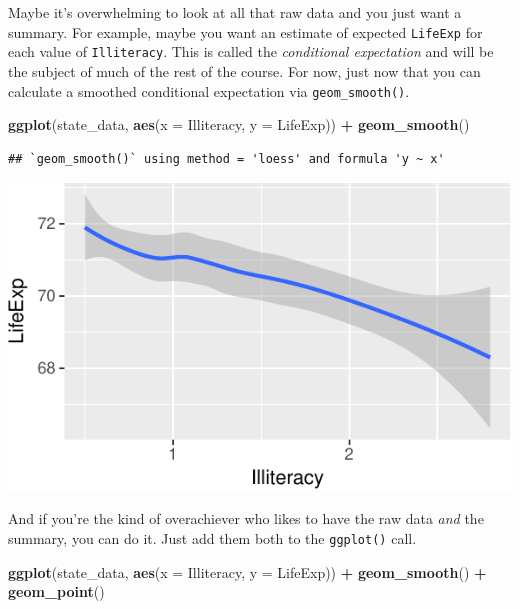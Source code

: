 \documentclass[12pt,oneside,openany]{book}
\newenvironment{Shaded}{\begin{snugshade}}{\end{snugshade}}
\newcommand{\KeywordTok}[1]{\textcolor[rgb]{0.13,0.29,0.53}{\textbf{#1}}}
\newcommand{\DataTypeTok}[1]{\textcolor[rgb]{0.13,0.29,0.53}{#1}}
\newcommand{\StringTok}[1]{\textcolor[rgb]{0.31,0.60,0.02}{#1}}
\newcommand{\OperatorTok}[1]{\textcolor[rgb]{0.81,0.36,0.00}{\textbf{#1}}}
\newcommand{\NormalTok}[1]{#1}
\begin{document}
Maybe it's overwhelming to look at all that raw data and you just want a
summary. For example, maybe you want an estimate of expected
\texttt{LifeExp} for each value of \texttt{Illiteracy}. This is called
the \emph{conditional expectation} and will be the subject of much of
the rest of the course. For now, just now that you can calculate a
smoothed conditional expectation via \texttt{geom\_smooth()}.

\begin{Shaded}
\begin{Highlighting}[]
\KeywordTok{ggplot}\NormalTok{(state_data, }\KeywordTok{aes}\NormalTok{(}\DataTypeTok{x =}\NormalTok{ Illiteracy, }\DataTypeTok{y =}\NormalTok{ LifeExp)) }\OperatorTok{+}
\StringTok{  }\KeywordTok{geom_smooth}\NormalTok{()}
\end{Highlighting}
\end{Shaded}

\begin{verbatim}
## `geom_smooth()` using method = 'loess' and formula 'y ~ x'
\end{verbatim}

\includegraphics{pdaps_files/figure-latex/smooth-1.pdf}

And if you're the kind of overachiever who likes to have the raw data
\emph{and} the summary, you can do it. Just add them both to the
\texttt{ggplot()} call.

\begin{Shaded}
\begin{Highlighting}[]
\KeywordTok{ggplot}\NormalTok{(state_data, }\KeywordTok{aes}\NormalTok{(}\DataTypeTok{x =}\NormalTok{ Illiteracy, }\DataTypeTok{y =}\NormalTok{ LifeExp)) }\OperatorTok{+}
\StringTok{  }\KeywordTok{geom_smooth}\NormalTok{() }\OperatorTok{+}
\StringTok{  }\KeywordTok{geom_point}\NormalTok{()}
\end{Highlighting}
\end{Shaded}
\end{document}
